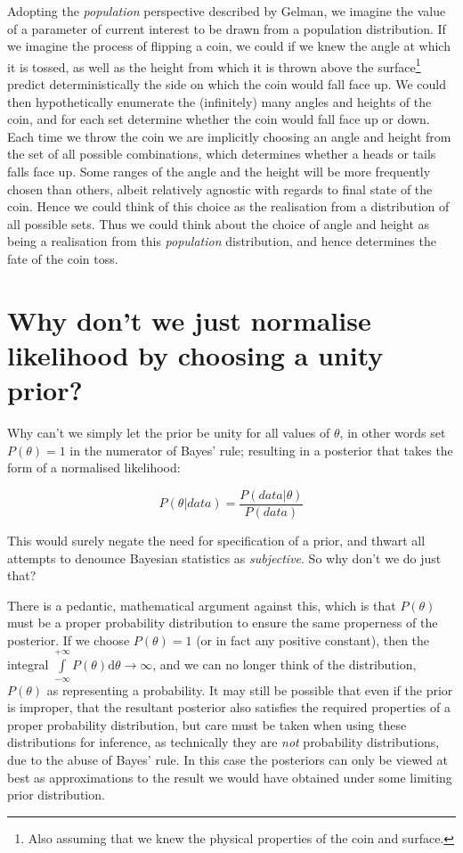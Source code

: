 \documentclass[11pt,fullpage]{book}
\begin{document}
Adopting the \textit{population} perspective described by Gelman, we imagine the value of a parameter of current interest to be drawn from a population distribution. If we imagine the process of flipping a coin, we could if we knew the angle at which it is tossed, as well as the height from which it is thrown above the surface\footnote{Also assuming that we knew the physical properties of the coin and surface.} predict deterministically the side on which the coin would fall face up. We could then hypothetically enumerate the (infinitely) many angles and heights of the coin, and for each set determine whether the coin would fall face up or down. Each time we throw the coin we are implicitly choosing an angle and height from the set of all possible combinations, which determines whether a heads or tails falls face up. Some ranges of the angle and the height will be more frequently chosen than others, albeit relatively agnostic with regards to final state of the coin.  Hence we could think of this choice as the realisation from a distribution of all possible sets. Thus we could think about the choice of angle and height as being a realisation from this \textit{population} distribution, and hence determines the fate of the coin toss.

\section{Why don't we just normalise likelihood by choosing a unity prior?}\label{sec:Prior_unityPrior}
Why can't we simply let the prior be unity for all values of $\theta$, in other words set $P(\theta) = 1$ in the numerator of Bayes' rule; resulting in a posterior that takes the form of a normalised likelihood:

\begin{equation}
P(\theta|data) = \frac{P(data|\theta)} {P(data)}
\end{equation}\label{eq:Prior_BayesNormalisedLikelihood}


This would surely negate the need for specification of a prior, and thwart all attempts to denounce Bayesian statistics as \textit{subjective}. So why don't we do just that? 

There is a pedantic, mathematical argument against this, which is that $P(\theta)$ must be a proper probability distribution to ensure the same properness of the posterior. If we choose $P(\theta) = 1$ (or in fact any positive constant), then the integral $\int\limits_{-\infty}^{+\infty}P(\theta)\mathrm{d}\theta\rightarrow\infty$, and we can no longer think of the distribution, $P(\theta)$ as representing a probability. It may still be possible that even if the prior is improper, that the resultant posterior also satisfies the required properties of a proper probability distribution, but care must be taken when using these distributions for inference, as technically they are \textit{not} probability distributions, due to the abuse of Bayes' rule. In this case the posteriors can only be viewed at best as approximations to the result we would have obtained under some limiting prior distribution.
\end{document}
